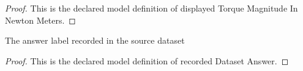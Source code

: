 \begin{proof}
  This is the declared model definition of displayed Torque Magnitude In Newton Meters.
\end{proof}
\begin{definition}
  \label{def:physics:phyx-mini-0967:phyxminiproblems-problemphyxmini0967-recordeddatasetanswer}
  The answer label recorded in the source dataset
\end{definition}
\begin{proof}
  This is the declared model definition of recorded Dataset Answer.
\end{proof}
